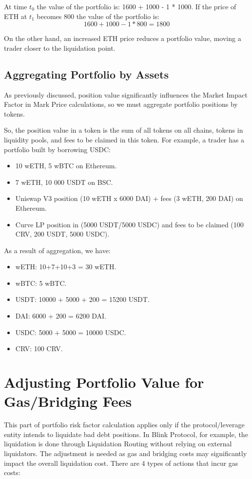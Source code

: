 \documentclass[conference]{IEEEtran}
\begin{document}
At time $t_{0}$ the value of the portfolio is: 1600 + 1000 - 1 * 1000. If the price of ETH at $t_{1}$ becomes 800 the value of the portfolio is: $$1600 +1000  - 1*800=1800$$

On the other hand, an increased ETH price reduces a portfolio value, moving a trader closer to the liquidation point. 



\subsection{Aggregating Portfolio by Assets}
As previously discussed, position value significantly influences the Market Impact Factor in Mark Price calculations, so we must aggregate portfolio positions by tokens. 

So, the position value in a token is the sum of all tokens on all chains, tokens in liquidity pools, and fees to be claimed in this token. For example, a trader has a portfolio built by borrowing USDC:
\begin{itemize}
	\item 10 wETH, 5 wBTC on Ethereum.
	\item 7 wETH, 10 000 USDT on BSC.
	\item Uniswap V3 position (10 wETH x 6000 DAI) + fees (3 wETH, 200 DAI) on Ethereum.
	\item Curve LP position in (5000 USDT/5000 USDC) and fees to be claimed (100 CRV, 200 USDT, 5000 USDC).
\end{itemize}

As a result of aggregation, we have:
\begin{itemize}
	\item wETH: 10+7+10+3 = 30 wETH.
	\item wBTC: 5 wBTC.
	\item USDT: 10000 + 5000 + 200 = 15200 USDT.
	\item DAI: 6000 + 200 = 6200 DAI.
	\item USDC: 5000 + 5000 = 10000 USDC.
	\item CRV: 100 CRV.
\end{itemize}

\section{Adjusting Portfolio Value for Gas/Bridging Fees}
This part of portfolio risk factor calculation applies only if the protocol/leverage entity intends to liquidate bad debt positions. In Blink Protocol, for example, the liquidation is done through Liquidation Routing without relying on external liquidators. The adjustment is needed as gas and bridging costs may significantly impact the overall liquidation cost. There are 4 types of actions that incur gas costs:
\end{document}
